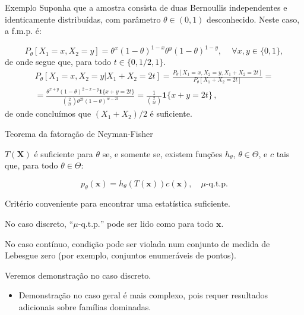\documentclass[11pt]{beamer}
\newenvironment{halfwideitemize}{\itemize\addtolength{\itemsep}{0.5em}}{\enditemize}
\begin{document}
	\begin{frame}{Exemplo}
		Suponha que a amostra consista de duas Bernoullis independentes e identicamente distribuídas, com parâmetro $\theta \in (0,1)$ desconhecido. Neste caso, a f.m.p. é:
		
		$$P_\theta[X_1 = x, X_2 = y] = \theta^x (1-\theta)^{1-x} \theta^y (1-\theta)^{1-y},\, \quad \forall x,y \in \{0,1\},$$
		de onde segue que, para todo $t \in \{0,1/2,1\}$.
		\begin{equation*}
			\begin{aligned}         
				P_\theta[X_1 = x, X_2 = y| X_1 +  X_2 =  2 t] = \frac{P_\theta[X_1 = x, X_2 = y, X_1 +  X_2 =  2 t]}{P_\theta[X_1 +  X_2 =  2 t]} = \\
				= \frac{\theta^{x+y} (1-\theta)^{2-x-y}\mathbf{1}\{x+y = 2t\}}{\binom{2}{2t} \theta^{2t}(1-\theta)^{w-2t}}= \frac{1}{\binom{2}{2t} } \mathbf{1}\{x+y = 2t\} \, ,
			\end{aligned}
		\end{equation*}
		de onde concluímos que $(X_1+X_2)/2$ é suficiente.
	\end{frame}
	\begin{frame}{Teorema da fatoração de Neyman-Fisher}
		\begin{theorem}
			$T(\boldsymbol{X})$ é suficiente para $\theta$ se, e somente se, existem funções $h_\theta$, $\theta \in \Theta$, e $c$ tais que, para todo $\theta \in \Theta$:
			
			$$p_\theta(\boldsymbol{x}) = h_\theta(T(\boldsymbol{x}) )c(\boldsymbol{x}), \quad \mu\text{-q.t.p.}$$
		\end{theorem}
		
		\begin{halfwideitemize}
			\item Critério conveniente para encontrar uma estatística suficiente.
			\begin{halfwideitemize}
				\item No caso discreto, ``$\mu\text{-q.t.p.}$'' pode ser lido como para todo $\boldsymbol{x}$.
				\item No caso contínuo, condição pode ser violada num conjunto de medida de Lebesgue zero (por exemplo, conjuntos enumeráveis de pontos).
			\end{halfwideitemize}
			\item Veremos demonstração no caso discreto.
			\begin{itemize}
				\item Demonstração no caso geral é mais complexo, pois requer resultados adicionais sobre famílias dominadas.
			\end{itemize}
		\end{halfwideitemize}
		
	\end{frame}
	
\end{document}
